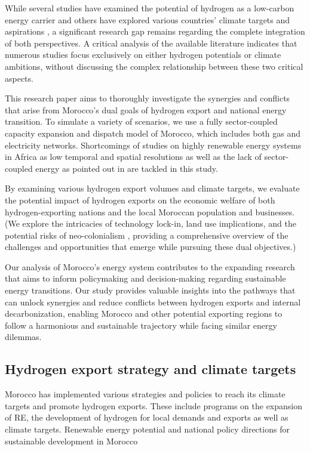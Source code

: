 While several studies have examined the potential of hydrogen as a low-carbon energy carrier \cite{Hampp2021, AbouSeada2022, Wijk2021} and others have explored various countries' climate targets and aspirations \cite{Boulakhbar2020}, a significant research gap remains regarding the complete integration of both perspectives. A critical analysis of the available literature indicates that numerous studies focus exclusively on either hydrogen potentials or climate ambitions, without discussing the complex relationship between these two critical aspects.

This research paper aims to thoroughly investigate the synergies and conflicts that arise from Morocco's dual goals of hydrogen export and national energy transition. To simulate a variety of scenarios, we use a fully sector-coupled capacity expansion and dispatch model of Morocco, which includes both gas and electricity networks. Shortcomings of studies on highly renewable energy systems in Africa as low temporal and spatial resolutions as well as the lack of sector-coupled energy as pointed out in \cite{Oyewo2023} are tackled in this study.

By examining various hydrogen export volumes and climate targets, we evaluate the potential impact of hydrogen exports on the economic welfare of both hydrogen-exporting nations and the local Moroccan population and businesses. (We explore the intricacies of technology lock-in, land use implications, and the potential risks of neo-colonialism \cite{HabeckEnergieimperialismus, TerraponPfaff2019, Hanger2016}, providing a comprehensive overview of the challenges and opportunities that emerge while pursuing these dual objectives.)

Our analysis of Morocco's energy system contributes to the expanding research that aims to inform policymaking and decision-making regarding sustainable energy transitions. Our study provides valuable insights into the pathways that can unlock synergies and reduce conflicts between hydrogen exports and internal decarbonization, enabling Morocco and other potential exporting regions to follow a harmonious and sustainable trajectory while facing similar energy dilemmas.





\subsection{Hydrogen export strategy and climate targets}
\label{subsec:policyandtargets}
Morocco has implemented various strategies and policies to reach its climate targets and promote hydrogen exports. These include programs on the expansion of RE, the development of hydrogen for local demands and exports as well as climate targets.
Renewable energy potential and national policy directions for sustainable development in Morocco \cite{Kousksou2015}


